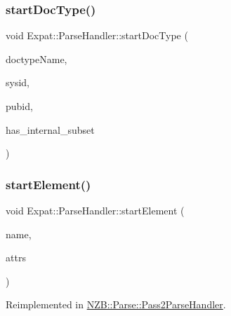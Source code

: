 \hypertarget{class_expat_1_1_parse_handler_a83d12b5e5f35a472655c178000993650}{}\label{class_expat_1_1_parse_handler_a83d12b5e5f35a472655c178000993650} 
\subsubsection{\texorpdfstring{start\+Doc\+Type()}{startDocType()}}
{\footnotesize\ttfamily void Expat\+::\+Parse\+Handler\+::start\+Doc\+Type (\begin{DoxyParamCaption}\item[{const X\+M\+L\+\_\+\+Char $\ast$}]{doctype\+Name,  }\item[{const X\+M\+L\+\_\+\+Char $\ast$}]{sysid,  }\item[{const X\+M\+L\+\_\+\+Char $\ast$}]{pubid,  }\item[{int}]{has\+\_\+internal\+\_\+subset }\end{DoxyParamCaption})\hspace{0.3cm}{\ttfamily [virtual]}}

\hypertarget{class_expat_1_1_parse_handler_aa6b631d6e771281fb965881545ebacfa}{}\label{class_expat_1_1_parse_handler_aa6b631d6e771281fb965881545ebacfa} 
\subsubsection{\texorpdfstring{start\+Element()}{startElement()}}
{\footnotesize\ttfamily void Expat\+::\+Parse\+Handler\+::start\+Element (\begin{DoxyParamCaption}\item[{const X\+M\+L\+\_\+\+Char $\ast$}]{name,  }\item[{const X\+M\+L\+\_\+\+Char $\ast$$\ast$}]{attrs }\end{DoxyParamCaption})\hspace{0.3cm}{\ttfamily [virtual]}}



Reimplemented in \hyperlink{class_n_z_b_1_1_parse_1_1_pass2_parse_handler_a2b3ab039352b1bf106d795188d0cd4c1}{N\+Z\+B\+::\+Parse\+::\+Pass2\+Parse\+Handler}.

\hypertarget{class_expat_1_1_parse_handler_a24dfc830fb9b782c7a6382725b678954}{}\label{class_expat_1_1_parse_handler_a24dfc830fb9b782c7a6382725b678954} 
